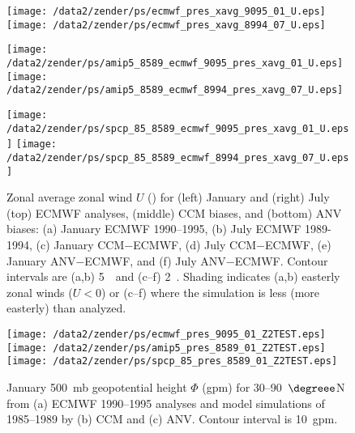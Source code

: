 \documentclass[twocolumn,final]{article}
\begin{document}
\begin{figure*}
\begin{center}
\texttt{[image: /data2/zender/ps/ecmwf\_pres\_xavg\_9095\_01\_U.eps]}%
\texttt{[image: /data2/zender/ps/ecmwf\_pres\_xavg\_8994\_07\_U.eps]}%

\texttt{[image: /data2/zender/ps/amip5\_8589\_ecmwf\_9095\_pres\_xavg\_01\_U.eps]}%
\texttt{[image: /data2/zender/ps/amip5\_8589\_ecmwf\_8994\_pres\_xavg\_07\_U.eps]}%

\texttt{[image: /data2/zender/ps/spcp\_85\_8589\_ecmwf\_9095\_pres\_xavg\_01\_U.eps]}%
\texttt{[image: /data2/zender/ps/spcp\_85\_8589\_ecmwf\_8994\_pres\_xavg\_07\_U.eps]}%
\end{center}
\caption[Zonal average zonal wind $U$ for January
and July ECMWF analyses, CCM biases, and ANV biases]{
Zonal average zonal wind $U$ (\mxs) for (left) January
and (right) July (top) ECMWF analyses, (middle) CCM biases, and (bottom)
ANV biases: (a) January ECMWF 1990--1995, (b) July ECMWF 1989-1994,
(c) January CCM$-$ECMWF, (d) July CCM$-$ECMWF, (e) January
ANV$-$ECMWF, and (f) July ANV$-$ECMWF.
Contour intervals are (a,b) 5~\mxs\ and (c--f) 2~\mxs. 
Shading indicates (a,b) easterly zonal winds ($U < 0$) or (c--f) where
the simulation is less (more easterly) than analyzed.
\label{fig:pres_xavg_8589_U}}   
\end{figure*}
\clearpage

\begin{figure*}
\begin{center}
\texttt{[image: /data2/zender/ps/ecmwf\_pres\_9095\_01\_Z2TEST.eps]}%
\texttt{[image: /data2/zender/ps/amip5\_pres\_8589\_01\_Z2TEST.eps]}%
\texttt{[image: /data2/zender/ps/spcp\_85\_pres\_8589\_01\_Z2TEST.eps]}%
\end{center}
\caption[January 500~mb geopotential height $\Phi$ for
30--90~$\degreee$N from ECMWF 1990--1995 analyses and model 
simulations of 1985--1989 by CCM and ANV]{
January 500~mb geopotential height $\Phi$ (gpm) for
30--90~$\degreee$N from (a) ECMWF 1990--1995 analyses and model 
simulations of 1985--1989 by (b) CCM and (c) ANV.
Contour interval is 10~gpm. 
\label{fig:pres_8589_Z2TEST}}   
\end{figure*}
\clearpage
\end{document}
